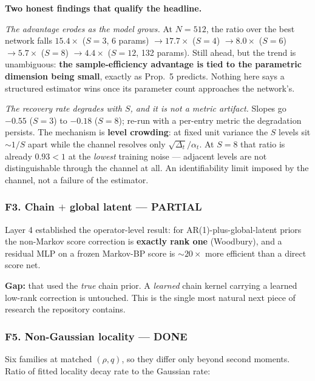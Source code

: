 \documentclass[11pt,a4paper]{article}
\newcommand{\done}{\textcolor{GoodGreen}{\textbf{DONE}}}
\newcommand{\partialx}{\textcolor{WarnAmber}{\textbf{PARTIAL}}}
\begin{document}
\begin{keybox}
\textbf{Two honest findings that qualify the headline.}

\emph{The advantage erodes as the model grows.} At $N=512$, the ratio over the best network
falls $15.4\times$ ($S=3$, 6 params) $\to 17.7\times$ ($S=4$) $\to 8.0\times$ ($S=6$)
$\to 5.7\times$ ($S=8$) $\to 4.4\times$ ($S=12$, 132 params). Still ahead, but the trend is
unambiguous: \textbf{the sample-efficiency advantage is tied to the parametric dimension
being small}, exactly as Prop.~5 predicts. Nothing here says a structured estimator wins
once its parameter count approaches the network's.

\emph{The recovery rate degrades with $S$, and it is not a metric artifact.} Slopes go
$-0.55$ ($S=3$) to $-0.18$ ($S=8$); re-run with a per-entry metric the degradation persists.
The mechanism is \textbf{level crowding}: at fixed unit variance the $S$ levels sit
${\sim}1/S$ apart while the channel resolves only $\sqrt{\Delta_t}/\alpha_t$. At $S=8$ that
ratio is already $0.93 < 1$ at the \emph{lowest} training noise --- adjacent levels are not
distinguishable through the channel at all. An identifiability limit imposed by the channel,
not a failure of the estimator.
\end{keybox}

\subsubsection*{F3. Chain $+$ global latent --- \partialx}

Layer 4 established the operator-level result: for AR(1)-plus-global-latent priors the
non-Markov score correction is \textbf{exactly rank one} (Woodbury), and a residual MLP on a
frozen Markov-BP score is ${\sim}20\times$ more efficient than a direct score net.

\textbf{Gap:} that used the \emph{true} chain prior. A \emph{learned} chain kernel carrying
a learned low-rank correction is untouched. This is the single most natural next piece of
research the repository contains.

\subsubsection*{F5. Non-Gaussian locality --- \done}

Six families at matched $(\rho,q)$, so they differ only beyond second moments. Ratio of
fitted locality decay rate to the Gaussian rate:
\end{document}
